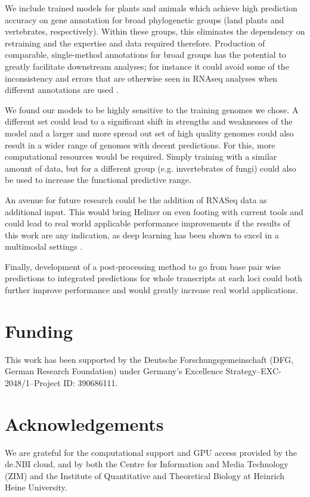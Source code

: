 \documentclass{bioinfo}
\begin{document}
We include trained models for plants and animals which achieve 
high prediction accuracy on gene annotation for broad 
phylogenetic groups (land plants and vertebrates, respectively).
Within these groups, this eliminates the dependency on retraining and the
expertise and data required therefore. Production of comparable, single-method
annotations for broad groups has the potential to greatly facilitate downstream
analyses; for instance it could avoid some of the inconsistency and errors that
are otherwise seen in RNAseq analyses when different annotations are used 
\citep{zhao2015comprehensive,torres2016robust}.

We found our models to be highly sensitive to the training genomes we chose. A 
different set could lead to a significant shift in strengths and weaknesses of the 
model and a larger and more spread out set of high quality genomes could also result 
in a wider range of genomes with decent predictions. For this, more computational 
resources would be required. Simply training with a similar amount of data, 
but for a different group (e.g. invertebrates of fungi) could also be used to 
increase the functional predictive range. 

An avenue for future research could be the addition of RNASeq data as additional 
input. This would bring Helixer on even footing with current tools and could lead 
to real world applicable performance improvements if the results of this work are 
any indication, as deep learning has been shown to excel in a multimodal settings 
\citep{ching2018opportunities}.

Finally, development of a post-processing method
to go from base pair wise predictions to integrated predictions for whole 
transcripts at each loci could both further improve performance and would
greatly increase real world applications.
\section*{Funding}
This work has been supported by the Deutsche Forschungsgemeinschaft (DFG, German Research Foundation) 
under Germany's Excellence Strategy--EXC-2048/1--Project ID: 390686111.\vspace*{-12pt}
\section*{Acknowledgements}
We are grateful for the computational support and GPU access provided by
the de.NBI cloud, and by both the Centre for Information and Media Technology (ZIM)
and the Institute of Quantitative and Theoretical Biology at Heinrich Heine University.
\end{document}
